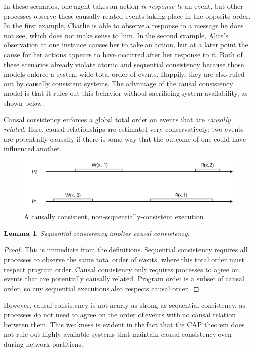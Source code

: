 \documentclass[]             %
{NASA}                       %
\newtheorem{lemma}[theorem]{Lemma}
\theoremstyle{definition}
\begin{document}
In these scenarios, one agent takes an action \emph{in response to} an
event, but other processes observe these causally-related events taking
place in the opposite order. In the first example, Charlie is able to
observe a response to a message he does not see, which does not make
sense to him. In the second example, Alice's observation at one instance
causes her to take an action, but at a later point the cause for her
actions appears to have occurred after her response to it. Both of these
scenarios already violate atomic and sequential consistency because
those models enforce a system-wide total order of events. Happily, they
are also ruled out by causally consistent systems. The advantage of the
causal consistency model is that it rules out this behavior without
sacrificing system availability, as shown below.

Causal consistency enforces a global total order on events that are
\emph{causally related}. Here, causal relationships are estimated very
conservatively: two events are potentially causally if there is some way
that the outcome of one could have influenced another.

\begin{figure}
  \center
  \includegraphics[scale=0.4]{images/causal1.png}
  \caption{A causally consistent, non-sequentially-consistent execution}
\end{figure}

\begin{lemma}
  Sequential consistency implies causal consistency.
\end{lemma}
\begin{proof}
  This is immediate from the definitions. Sequential consistency
  requires all processes to observe the same total order of events,
  where this total order must respect program order. Causal consistency
  only requires processes to agree on events that are potentially
  causally related. Program order is a subset of causal order, so any
  sequential executions also respects causal order.
\end{proof}

However, causal consistency is not nearly as strong as sequential
consistency, as processes do not need to agree on the order of events
with no causal relation between them. This weakness is evident in the
fact that the CAP theorem does not rule out highly available systems
that maintain causal consistency even during network partitions.
\end{document}
